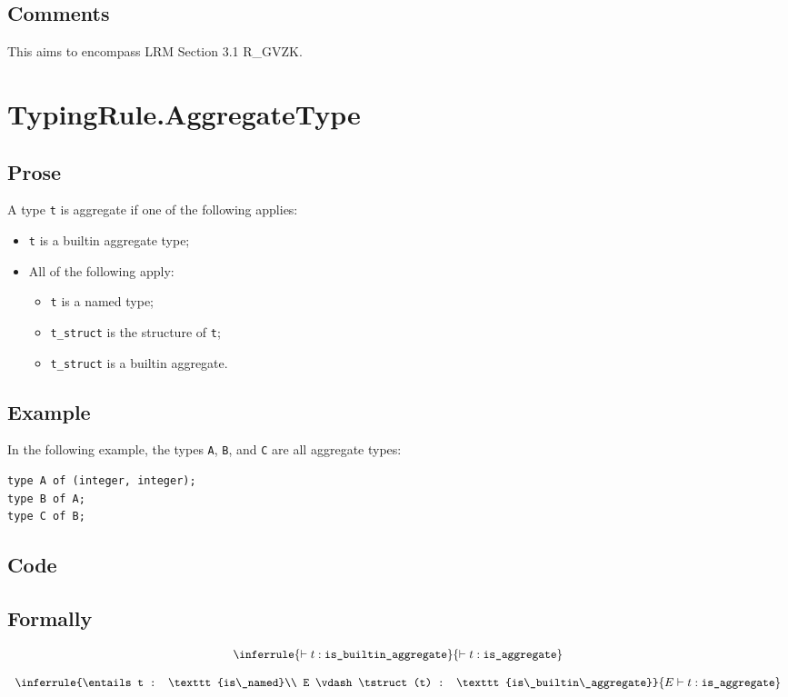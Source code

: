 \documentclass{book}
\newcommand\isbuiltinaggregate[0]{\texttt{is\_builtin\_aggregate}}
\newcommand\isnamed[0]{\texttt{is\_named}}
\newcommand\isaggregate[0]{\texttt{is\_aggregate}}
\begin{document}
    \subsection{Comments}
    This aims to encompass LRM Section 3.1 R\_GVZK.

\section{TypingRule.AggregateType}

    \subsection{Prose}
    A type \texttt{t} is aggregate if one of the following applies:
    \begin{itemize}
    \item \texttt{t} is a builtin aggregate type;
    \item All of the following apply:
      \begin{itemize}
      \item \texttt{t} is a named type;
      \item \texttt{t\_struct} is the structure of \texttt{t};
      \item \texttt{t\_struct} is a builtin aggregate.
      \end{itemize}
    \end{itemize}

    \subsection{Example}
In the following example, the types \texttt{A}, \texttt{B}, and \texttt{C} are all aggregate types:
\begin{verbatim}
type A of (integer, integer);
type B of A;
type C of B;
\end{verbatim}

    \subsection{Code}

\begin{formal}
      \subsection{Formally}
      
\[
\begin{array}{c}
\inferrule{\entails t : \isbuiltinaggregate}{\entails t : \isaggregate}\\
\\
\inferrule{\entails t : \isnamed \\ E \vdash \tstruct(t) : \isbuiltinaggregate}{E \entails t : \isaggregate}
\end{array}
\]
\end{formal}
\end{document}
